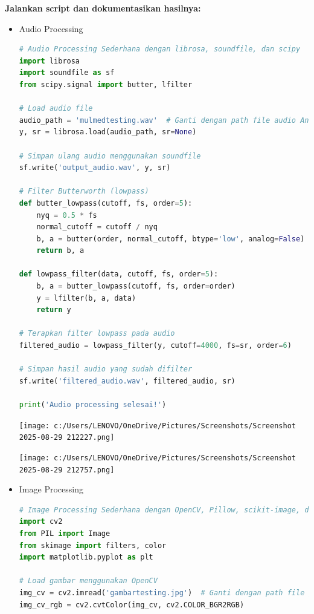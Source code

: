 \documentclass[11pt,a4paper]{article}
\begin{document}
\textbf{Jalankan script dan dokumentasikan hasilnya:}
\begin{itemize}
    \item Audio Processing
        \begin{lstlisting}[language=Python, caption={Audio Processing Sederhana dengan librosa, soundfile dan scipy}]
# Audio Processing Sederhana dengan librosa, soundfile, dan scipy
import librosa
import soundfile as sf
from scipy.signal import butter, lfilter

# Load audio file
audio_path = 'mulmedtesting.wav'  # Ganti dengan path file audio Anda
y, sr = librosa.load(audio_path, sr=None)

# Simpan ulang audio menggunakan soundfile
sf.write('output_audio.wav', y, sr)

# Filter Butterworth (lowpass)
def butter_lowpass(cutoff, fs, order=5):
    nyq = 0.5 * fs
    normal_cutoff = cutoff / nyq
    b, a = butter(order, normal_cutoff, btype='low', analog=False)
    return b, a

def lowpass_filter(data, cutoff, fs, order=5):
    b, a = butter_lowpass(cutoff, fs, order=order)
    y = lfilter(b, a, data)
    return y

# Terapkan filter lowpass pada audio
filtered_audio = lowpass_filter(y, cutoff=4000, fs=sr, order=6)

# Simpan hasil audio yang sudah difilter
sf.write('filtered_audio.wav', filtered_audio, sr)

print('Audio processing selesai!')
        \end{lstlisting}
        \begin{flushleft}
            \texttt{[image: c:/Users/LENOVO/OneDrive/Pictures/Screenshots/Screenshot 2025-08-29 212227.png]}
        \end{flushleft}
        \begin{flushleft}
            \texttt{[image: c:/Users/LENOVO/OneDrive/Pictures/Screenshots/Screenshot 2025-08-29 212757.png]}
        \end{flushleft}
    \item Image Processing
        \begin{lstlisting}[language=Python, caption={Image Processing Sederhana dengan OpenCV, Pillow, scikit-image, dan matplotlib}]
# Image Processing Sederhana dengan OpenCV, Pillow, scikit-image, dan matplotlib
import cv2
from PIL import Image
from skimage import filters, color
import matplotlib.pyplot as plt

# Load gambar menggunakan OpenCV
img_cv = cv2.imread('gambartesting.jpg')  # Ganti dengan path file gambar Anda
img_cv_rgb = cv2.cvtColor(img_cv, cv2.COLOR_BGR2RGB)


\end{lstlisting}
\end{itemize}
\end{document}
